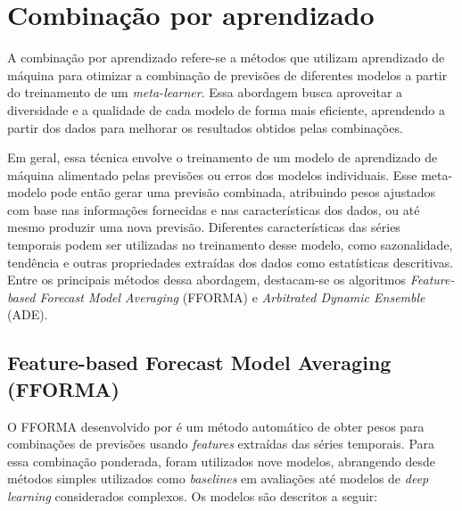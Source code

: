 \section{Combinação por aprendizado} \label{sec:baseadas_em_erro}

A combinação por aprendizado refere-se a métodos que utilizam aprendizado de máquina para otimizar a combinação de previsões de diferentes modelos a partir do treinamento de um \textit{meta-learner}. Essa abordagem busca aproveitar a diversidade e a qualidade de cada modelo de forma mais eficiente, aprendendo a partir dos dados para melhorar os resultados obtidos pelas combinações.  

Em geral, essa técnica envolve o treinamento de um modelo de aprendizado de máquina alimentado pelas previsões ou erros dos modelos individuais. Esse meta-modelo pode então gerar uma previsão combinada, atribuindo pesos ajustados com base nas informações fornecidas e nas características dos dados, ou até mesmo produzir uma nova previsão. Diferentes características das séries temporais podem ser utilizadas no treinamento desse modelo, como sazonalidade, tendência e outras propriedades extraídas dos dados como estatísticas descritivas. Entre os principais métodos dessa abordagem, destacam-se os algoritmos \textit{Feature-based Forecast Model Averaging} (FFORMA) e \textit{Arbitrated Dynamic Ensemble} (ADE).


\subsection{Feature-based Forecast Model Averaging (FFORMA)}

O FFORMA desenvolvido por \cite{fforma2019} é um método automático de obter pesos para combinações de previsões usando \textit{features} extraídas das séries temporais.
Para essa combinação ponderada, foram utilizados nove modelos, abrangendo desde métodos simples utilizados como \textit{baselines} em avaliações até modelos de \textit{deep learning} considerados complexos. Os modelos são descritos a seguir:

